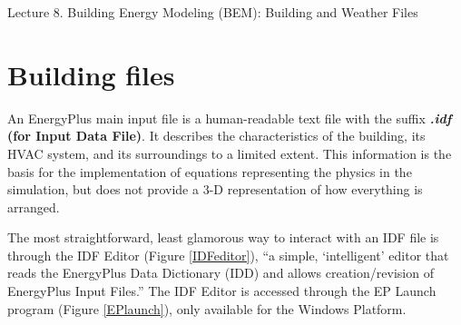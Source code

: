 \documentclass[10pt]{article}
\begin{document}
   \noindent
   \begin{center}

   \hrulefill
   
   \vspace{5pt}
   
   \vspace{0pt}
   
   {\Large \hfill  Lecture 8. Building Energy Modeling (BEM): Building and Weather Files}
   \vspace{5pt}
   
  
   \hrulefill
   \end{center}


{}

\section{Building files}

An EnergyPlus main input file is a human-readable text file with the suffix \textbf{\textit{.idf} (for Input Data File)}. It describes the characteristics of the building, its HVAC system, and its surroundings to a limited extent. This information is the basis for the implementation of equations representing the physics in the simulation, but does not provide a 3-D representation of how everything is arranged. 


The most straightforward, least glamorous way to interact with an IDF file is through the IDF Editor (Figure \ref{IDFeditor}), ``a simple, `intelligent' editor that reads the EnergyPlus Data Dictionary (IDD) and allows creation/revision of EnergyPlus Input Files.'' \cite{EP9docs} The IDF Editor is accessed through the EP Launch program (Figure \ref{EPlaunch}), only available for the Windows Platform.
\end{document}
